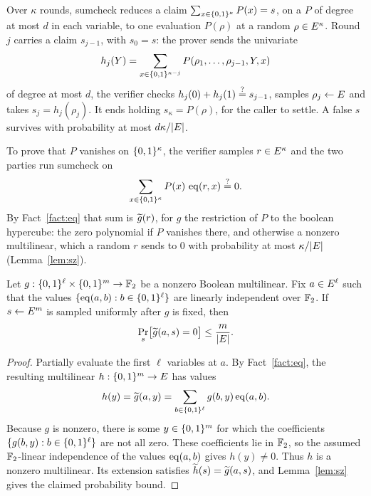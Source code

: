 \begin{fact}\label{fact:sumcheck}
Over $\kappa$ rounds, sumcheck reduces a claim $\sum_{x\in\{0,1\}^{\kappa}}P(x)=s$, on a $P$ of degree at most $d$ in each variable, to one evaluation $P(\rho)$ at a random $\rho\in E^{\kappa}$. Round $j$ carries a claim $s_{j-1}$, with $s_0=s$: the prover sends the univariate
\[
  h_j(Y)=\sum_{x\in\{0,1\}^{\kappa-j}}P(\rho_1,\dots,\rho_{j-1},Y,x)
\]
of degree at most $d$, the verifier checks $h_j(0)+h_j(1)\stackrel{?}{=} s_{j-1}$, samples $\rho_j\leftarrow E$ and takes $s_j=h_j(\rho_j)$. It ends holding $s_{\kappa}=P(\rho)$, for the caller to settle. A false $s$ survives with probability at most $d\kappa/|E|$.
\end{fact}

\begin{definition}[Zerocheck]\label{def:zerocheck}
To prove that $P$ vanishes on $\{0,1\}^{\kappa}$, the verifier samples $r\in E^{\kappa}$ and the two parties run sumcheck on
\[
  \sum_{x\in\{0,1\}^{\kappa}}P(x)\,\operatorname{eq}(r,x)\stackrel{?}{=} 0 .
\]
By Fact~\ref{fact:eq} that sum is $\widetilde{g}(r)$, for $g$ the restriction of $P$ to the boolean hypercube: the zero polynomial if $P$ vanishes there, and otherwise a nonzero multilinear, which a random $r$ sends to $0$ with probability at most $\kappa/|E|$ (Lemma~\ref{lem:sz}).
\end{definition}

\begin{lemma}\label{lem:fixed-zerocheck}
Let $g:\{0,1\}^{\ell}\times\{0,1\}^{m}\to\mathbb{F}_2$ be a nonzero Boolean multilinear. Fix $a\in E^{\ell}$ such that the values $\{\operatorname{eq}(a,b):b\in\{0,1\}^{\ell}\}$ are linearly independent over $\mathbb{F}_2$. If $s\leftarrow E^m$ is sampled uniformly after $g$ is fixed, then
\[
  \Pr_s\bigl[\widetilde{g}(a,s)=0\bigr]\leq\frac{m}{|E|}.
\]
\end{lemma}

\begin{proof}
Partially evaluate the first $\ell$ variables at $a$. By Fact~\ref{fact:eq}, the resulting multilinear $h:\{0,1\}^{m}\to E$ has values
\[
  h(y)=\widetilde{g}(a,y)=\sum_{b\in\{0,1\}^{\ell}}g(b,y)\operatorname{eq}(a,b).
\]
Because $g$ is nonzero, there is some $y\in\{0,1\}^{m}$ for which the coefficients $\{g(b,y):b\in\{0,1\}^{\ell}\}$ are not all zero. These coefficients lie in $\mathbb{F}_2$, so the assumed $\mathbb{F}_2$-linear independence of the values $\operatorname{eq}(a,b)$ gives $h(y)\neq0$. Thus $h$ is a nonzero multilinear. Its extension satisfies $\widetilde{h}(s)=\widetilde{g}(a,s)$, and Lemma~\ref{lem:sz} gives the claimed probability bound.
\end{proof}


